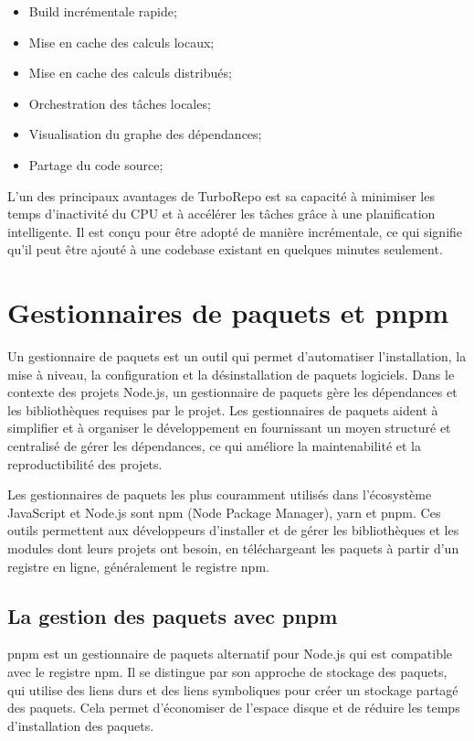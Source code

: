 \begin{itemize}
    \item Build incrémentale rapide;
    \item Mise en cache des calculs locaux;
    \item Mise en cache des calculs distribués;
    \item Orchestration des tâches locales;
    \item Visualisation du graphe des dépendances;
    \item Partage du code source;
\end{itemize}

L'un des principaux avantages de TurboRepo est sa capacité à minimiser les temps d'inactivité du CPU et à accélérer les tâches grâce à une planification intelligente. Il est conçu pour être adopté de manière incrémentale, ce qui signifie qu'il peut être ajouté à une codebase existant en quelques minutes seulement.

\section{Gestionnaires de paquets et pnpm}

Un gestionnaire de paquets est un outil qui permet d'automatiser l'installation, la mise à niveau, la configuration et la désinstallation de paquets logiciels. Dans le contexte des projets \gls{Node.js}, un gestionnaire de paquets gère les dépendances et les bibliothèques requises par le projet. Les gestionnaires de paquets aident à simplifier et à organiser le développement en fournissant un moyen structuré et centralisé de gérer les dépendances, ce qui améliore la maintenabilité et la reproductibilité des projets.

Les gestionnaires de paquets les plus couramment utilisés dans l'écosystème JavaScript et \gls{Node.js} sont \gls{npm} (Node Package Manager), yarn et \gls{pnpm}. Ces outils permettent aux développeurs d'installer et de gérer les bibliothèques et les modules dont leurs projets ont besoin, en téléchargeant les paquets à partir d'un registre en ligne, généralement le registre \gls{npm}\cite{Npm}.

\subsection{La gestion des paquets avec pnpm}

pnpm\cite{MotivationPnpm} est un gestionnaire de paquets alternatif pour \gls{Node.js} qui est compatible avec le registre \gls{npm}. Il se distingue par son approche de stockage des paquets, qui utilise des liens durs et des liens symboliques pour créer un stockage partagé des paquets. Cela permet d'économiser de l'espace disque et de réduire les temps d'installation des paquets.

